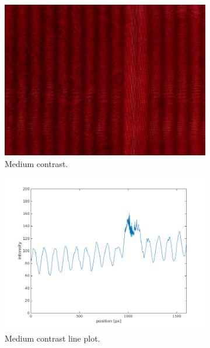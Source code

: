 \documentclass[a4paper, 12pt]{paper}
\begin{document}
\begin{figure}[H]
\begin{subfigure}[t]{0.45\textwidth}
    \end{subfigure}
    \begin{subfigure}[t]{0.40\textwidth}
        \includegraphics[width=\textwidth]{img/137}
        \caption{Medium contrast.}
    \end{subfigure}
    \begin{subfigure}[t]{0.45\textwidth}
        \includegraphics[width=\textwidth]{img/medium_contrast_line}
        \caption{Medium contrast line plot.}
    \end{subfigure}
    \begin{subfigure}[t]{0.40\textwidth}

\end{subfigure}
\end{figure}
\end{document}
